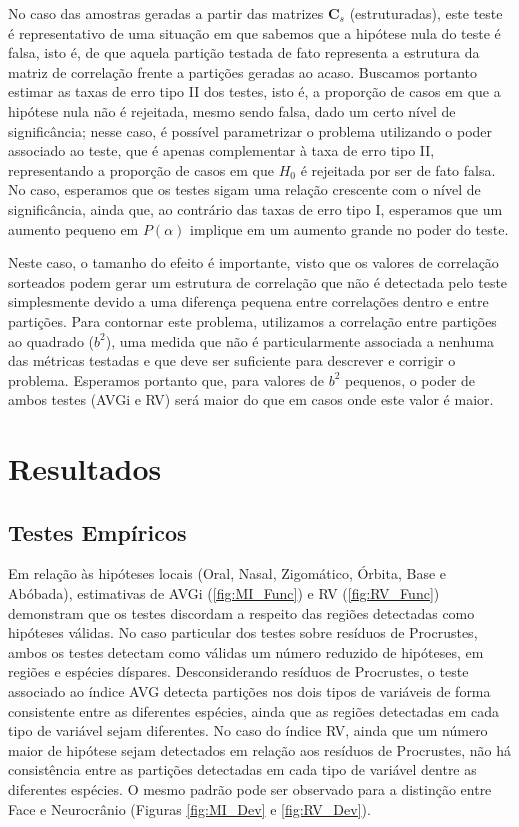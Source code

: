 \documentclass[12pt,]{article}
\begin{document}
No caso das amostras geradas a partir das matrizes $\mathbf{C}_s$
(estruturadas), este teste é representativo de uma situação em que
sabemos que a hipótese nula do teste é falsa, isto é, de que aquela
partição testada de fato representa a estrutura da matriz de correlação
frente a partições geradas ao acaso. Buscamos portanto estimar as taxas
de erro tipo II dos testes, isto é, a proporção de casos em que a
hipótese nula não é rejeitada, mesmo sendo falsa, dado um certo nível de
significância; nesse caso, é possível parametrizar o problema utilizando
o poder associado ao teste, que é apenas complementar à taxa de erro
tipo II, representando a proporção de casos em que $H_0$ é rejeitada por
ser de fato falsa. No caso, esperamos que os testes sigam uma relação
crescente com o nível de significância, ainda que, ao contrário das
taxas de erro tipo I, esperamos que um aumento pequeno em $P(\alpha)$
implique em um aumento grande no poder do teste.

Neste caso, o tamanho do efeito é importante, visto que os valores de
correlação sorteados podem gerar um estrutura de correlação que não é
detectada pelo teste simplesmente devido a uma diferença pequena entre
correlações dentro e entre partições. Para contornar este problema,
utilizamos a correlação entre partições ao quadrado ($b^2$), uma medida
que não é particularmente associada a nenhuma das métricas testadas e
que deve ser suficiente para descrever e corrigir o problema. Esperamos
portanto que, para valores de $b^2$ pequenos, o poder de ambos testes
(AVGi e RV) será maior do que em casos onde este valor é maior.

\section{Resultados}\label{resultados}

\subsection{Testes Empíricos}\label{testes-empiricos}

Em relação às hipóteses locais (Oral, Nasal, Zigomático, Órbita, Base e
Abóbada), estimativas de AVGi (\autoref{fig:MI_Func}) e RV
(\autoref{fig:RV_Func}) demonstram que os testes discordam a respeito
das regiões detectadas como hipóteses válidas. No caso particular dos
testes sobre resíduos de Procrustes, ambos os testes detectam como
válidas um número reduzido de hipóteses, em regiões e espécies díspares.
Desconsiderando resíduos de Procrustes, o teste associado ao índice AVG
detecta partições nos dois tipos de variáveis de forma consistente entre
as diferentes espécies, ainda que as regiões detectadas em cada tipo de
variável sejam diferentes. No caso do índice RV, ainda que um número
maior de hipótese sejam detectados em relação aos resíduos de
Procrustes, não há consistência entre as partições detectadas em cada
tipo de variável dentre as diferentes espécies. O mesmo padrão pode ser
observado para a distinção entre Face e Neurocrânio (Figuras
\ref{fig:MI_Dev} e \ref{fig:RV_Dev}).
\end{document}
